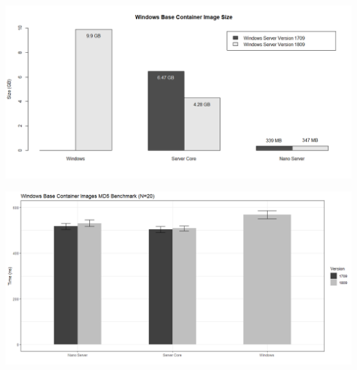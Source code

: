 \documentclass[a0,portrait]{a0poster}
\begin{document}
\begin{multicols}{2}
\begin{center}\vspace{1cm}
    \includegraphics[width=1.0\linewidth]{../bachproef/img/Methodologie/Containers0}
\end{center}\vspace{1cm}
\begin{center}\vspace{1cm}
    \includegraphics[width=1.0\linewidth]{../bachproef/img/Methodologie/Containers1}
\end{center}\vspace{1cm}
%




\color{HoGentAccent1} 

\end{multicols}
\end{document}
